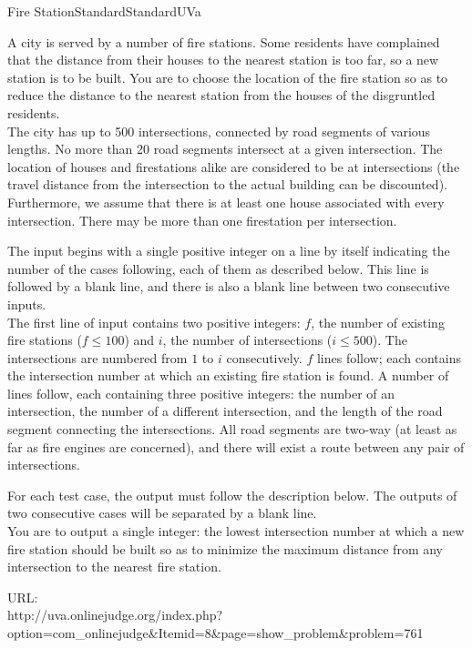 \begin{problema}{Fire Station}{Standard}{Standard}{UVa} 

A city is served by a number of fire stations. Some residents have complained that the distance from their houses to the nearest station is too far, so a new station is to be built. You are to choose the location of the fire station so as to reduce the distance to the nearest station from the houses of the disgruntled residents.  \\

The city has up to 500 intersections, connected by road segments of various lengths. No more than 20 road segments intersect at a given intersection. The location of houses and firestations alike are considered to be at intersections (the travel distance from the intersection to the actual building can be discounted). Furthermore, we assume that there is at least one house associated with every intersection. There may be more than one firestation per intersection. \\



\InputFile

The input begins with a single positive integer on a line by itself indicating the number of the cases following, each of them as described below. This line is followed by a blank line, and there is also a blank line between two consecutive inputs.  \\


The first line of input contains two positive integers: $f$, the number of existing fire stations ($f \leq 100$) and $i$, the number of intersections ($i \leq 500$). The intersections are numbered from $1$ to $i$ consecutively. $f$ lines follow; each contains the intersection number at which an existing fire station is found. A number of lines follow, each containing three positive integers: the number of an intersection, the number of a different intersection, and the length of the road segment connecting the intersections. All road segments are two-way (at least as far as fire engines are concerned), and there will exist a route between any pair of intersections. 
 \\


\OutputFile

For each test case, the output must follow the description below. The outputs of two consecutive cases will be separated by a blank line.  \\


You are to output a single integer: the lowest intersection number at which a new fire station should be built so as to minimize the maximum distance from any intersection to the nearest fire station. \\



\Example




URL:\\ 
http://uva.onlinejudge.org/index.php? \\
option=com\_onlinejudge\&Itemid=8\&page=show\_problem\&problem=761


\end{problema}
